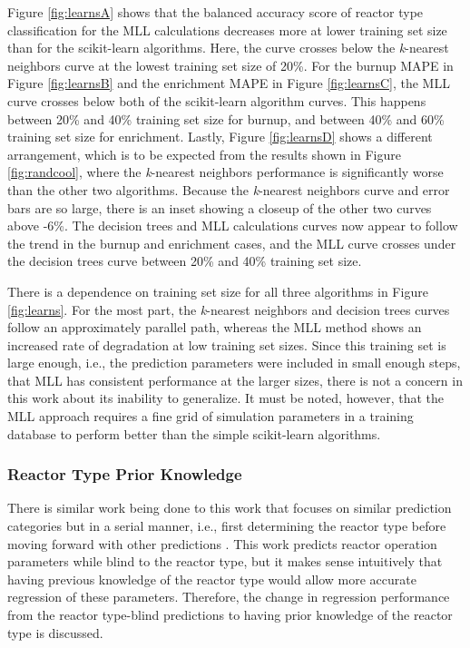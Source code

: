 Figure \ref{fig:learnsA} shows that the balanced accuracy score of reactor type
classification for the \gls{MLL} calculations decreases more at lower training
set size than for the scikit-learn algorithms. Here, the curve crosses below
the \textit{k}-nearest neighbors curve at the lowest training set size of 20\%.
For the burnup \gls{MAPE} in Figure \ref{fig:learnsB} and the enrichment
\gls{MAPE} in Figure \ref{fig:learnsC}, the \gls{MLL} curve crosses below both
of the scikit-learn algorithm curves. This happens between 20\% and 40\%
training set size for burnup, and between 40\% and 60\% training set size for
enrichment.  Lastly, Figure \ref{fig:learnsD} shows a different arrangement,
which is to be expected from the results shown in Figure \ref{fig:randcool},
where the \textit{k}-nearest neighbors performance is significantly worse than
the other two algorithms. Because the \textit{k}-nearest neighbors curve and
error bars are so large, there is an inset showing a closeup of the other two
curves above -6\%.  The decision trees and \gls{MLL} calculations curves now
appear to follow the trend in the burnup and enrichment cases, and the
\gls{MLL} curve crosses under the decision trees curve between 20\% and 40\%
training set size.  

There is a dependence on training set size for all three algorithms in Figure
\ref{fig:learns}. For the most part, the \textit{k}-nearest neighbors and
decision trees curves follow an approximately parallel path, whereas the
\gls{MLL} method shows an increased rate of degradation at low training set
sizes. Since this training set is large enough, i.e., the prediction parameters
were included in small enough steps, that \gls{MLL} has consistent performance
at the larger sizes, there is not a concern in this work about its inability to
generalize. It must be noted, however, that the \gls{MLL} approach requires a
fine grid of simulation parameters in a training database to perform better
than the simple scikit-learn algorithms.

\subsubsection{Reactor Type Prior Knowledge}
\label{sec:randerrD}

There is similar work being done to this work that focuses on similar
prediction categories but in a serial manner, i.e., first determining the
reactor type before moving forward with other predictions \cite{serial_ml}.
This work predicts reactor operation parameters while blind to the reactor
type, but it makes sense intuitively that having previous knowledge of the
reactor type would allow more accurate regression of these parameters.
Therefore, the change in regression performance from the reactor type-blind
predictions to having prior knowledge of the reactor type is discussed.

